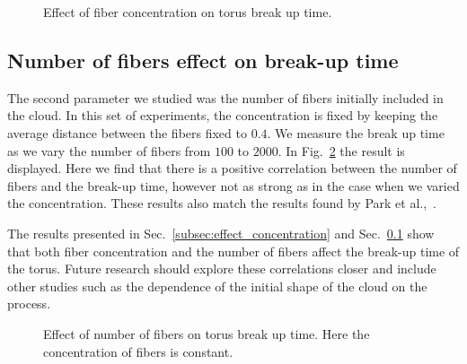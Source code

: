 \begin{figure}[htbp]
  \centering
  \caption[Effect of fiber concentration on torus break up time.]{Effect of fiber concentration on torus break up time.}
  \label{fig:concentration_breakup}
\end{figure}

\subsection{Number of fibers effect on break-up time}
\label{subsec:effect_number}

The second parameter we studied was the number of fibers initially included in the cloud. In this set of experiments, the concentration is fixed by keeping the average distance between the fibers fixed to $0.4$. We measure the break up time as we vary the number of fibers from $100$ to $2000$. In Fig.~\ref{fig:number_breakup} the result is displayed. Here we find that there is a positive correlation between the number of fibers and the break-up time, however not as strong as in the case when we varied the concentration. These results also match the results found by Park et al.,~\cite{Park2010}.

The results presented in Sec.~\ref{subsec:effect_concentration} and Sec.~\ref{subsec:effect_number} show that both fiber concentration and the number of fibers affect the break-up time of the torus. Future research should explore these correlations closer and include other studies such as the dependence of the initial shape of the cloud on the process.

\begin{figure}[htbp]
  \centering
  \caption[Effect of number of fibers on torus break up time.]{Effect of number of fibers on torus break up time. Here the concentration of fibers is constant.}
  \label{fig:number_breakup}
\end{figure}

